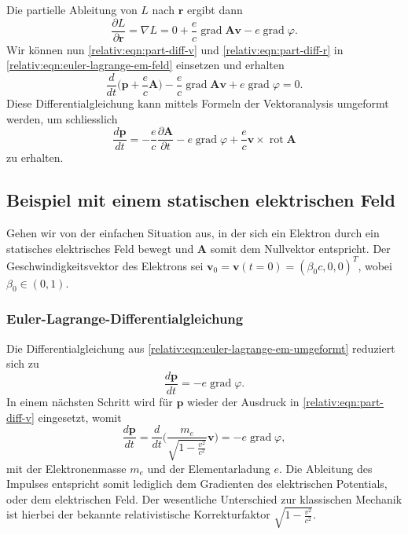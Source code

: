 Die partielle Ableitung von \(L\) nach \(\bm{r}\) ergibt dann
\begin{equation}
    \frac{\partial L}{\partial \bm{r}} = \nabla L
    = 0 + \frac{e}{c} \operatorname{grad} \bm{Av} - e \operatorname{grad} \varphi.
    \label{relativ:eqn:part-diff-r}
\end{equation}
Wir können nun \eqref{relativ:eqn:part-diff-v} und \eqref{relativ:eqn:part-diff-r}
in \eqref{relativ:eqn:euler-lagrange-em-feld} einsetzen und erhalten
\begin{equation}
    \frac{d}{dt} \biggl(\bm{p} + \frac{e}{c} \bm{A}\biggr)
    - \frac{e}{c} \operatorname{grad} \bm{Av} + e \operatorname{grad} \varphi = 0.
    \label{relativ:eqn:euler-lagrange-em-eingesetzt}
\end{equation}
Diese Differentialgleichung kann mittels Formeln der Vektoranalysis
umgeformt werden, um schliesslich
\begin{equation}
    \frac{d\bm{p}}{dt} = -\frac{e}{c} \frac{\partial\bm{A}}{\partial t}
    - e \operatorname{grad} \varphi +
    \frac{e}{c} \bm{v} \times \operatorname{rot} \bm{A}
    \label{relativ:eqn:euler-lagrange-em-umgeformt}
\end{equation}
zu erhalten.

\subsection{Beispiel mit einem statischen elektrischen Feld
\label{relativ:section:teilchen-konst-e-feld}}

Gehen wir von der einfachen Situation aus,
in der sich ein Elektron durch ein statisches
elektrisches Feld bewegt und \(\bm{A}\)
somit dem Nullvektor entspricht.
Der Geschwindigkeitsvektor des Elektrons sei
\(\bm{v}_0 = \bm{v}(t=0) =(\beta_0 c, 0, 0)^T\), wobei
\(\beta_0 \in (0, 1)\).

\subsubsection{Euler-Lagrange-Differentialgleichung}
Die Differentialgleichung aus \eqref{relativ:eqn:euler-lagrange-em-umgeformt} reduziert sich zu
\begin{equation}
    \frac{d\bm{p}}{dt} =
    - e \operatorname{grad} \varphi.
    \label{relativ:eqn:euler-lagrange-bsp-1}
\end{equation}
In einem nächsten Schritt wird für \(\bm{p}\)
wieder der Ausdruck in \eqref{relativ:eqn:part-diff-v} eingesetzt,
womit
\begin{equation}
    \frac{d\bm{p}}{dt} =
    \frac{d}{dt} \Biggl(\frac{m_e}{\sqrt{1-\frac{v^2}{c^2}}} \bm{v}\Biggr) =
    - e \operatorname{grad} \varphi,
    \label{relativ:eqn:euler-lagrange-bsp-eingesetzt}
\end{equation}
mit der Elektronenmasse \(m_e\) und der Elementarladung \(e\).
Die Ableitung des Impulses entspricht somit lediglich
dem Gradienten des elektrischen Potentials, oder dem elektrischen Feld.
Der wesentliche Unterschied zur klassischen Mechanik ist hierbei
der bekannte relativistische Korrekturfaktor
\(\sqrt{1-\frac{v^2}{c^2}}\).

